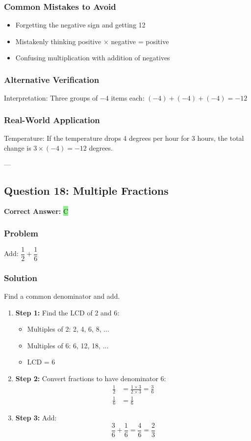 \documentclass[12pt]{article}
\begin{document}
\subsubsection*{Common Mistakes to Avoid}
\begin{itemize}
\item Forgetting the negative sign and getting 12
\item Mistakenly thinking positive $\times$ negative = positive
\item Confusing multiplication with addition of negatives
\end{itemize}

\subsubsection*{Alternative Verification}
Interpretation: Three groups of $-4$ items each: $(-4) + (-4) + (-4) = -12$ 

\subsubsection*{Real-World Application}
Temperature: If the temperature drops 4 degrees per hour for 3 hours, the total change is $3 \times (-4) = -12$ degrees.

---

\subsection{Question 18: Multiple Fractions}

\textbf{Correct Answer: } \colorbox{lightgreen}{C}

\subsubsection*{Problem}
Add: $\dfrac{1}{2} + \dfrac{1}{6}$

\subsubsection*{Solution}

Find a common denominator and add.

\begin{enumerate}
\item \textbf{Step 1:} Find the LCD of 2 and 6:
  \begin{itemize}
  \item Multiples of 2: 2, 4, 6, 8, ...
  \item Multiples of 6: 6, 12, 18, ...
  \item LCD = 6
  \end{itemize}
\item \textbf{Step 2:} Convert fractions to have denominator 6:
  \begin{align*}
  \frac{1}{2} &= \frac{1 \times 3}{2 \times 3} = \frac{3}{6} \\
  \frac{1}{6} &= \frac{1}{6}
  \end{align*}
\item \textbf{Step 3:} Add:
  \[
  \frac{3}{6} + \frac{1}{6} = \frac{4}{6} = \frac{2}{3}
  \]
\end{enumerate}
\end{document}
